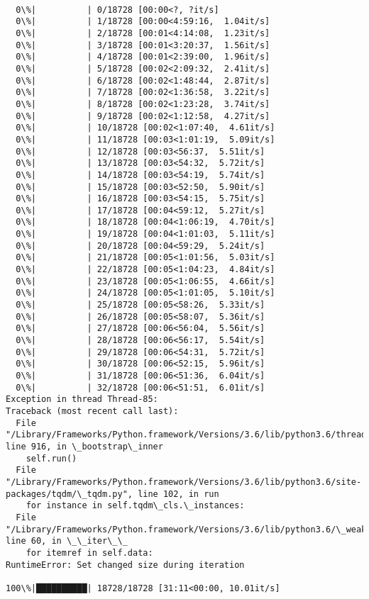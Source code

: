 \documentclass[11pt]{article}
\begin{document}
    \begin{Verbatim}[commandchars=\\\{\}]

  0\%|          | 0/18728 [00:00<?, ?it/s]
  0\%|          | 1/18728 [00:00<4:59:16,  1.04it/s]
  0\%|          | 2/18728 [00:01<4:14:08,  1.23it/s]
  0\%|          | 3/18728 [00:01<3:20:37,  1.56it/s]
  0\%|          | 4/18728 [00:01<2:39:00,  1.96it/s]
  0\%|          | 5/18728 [00:02<2:09:32,  2.41it/s]
  0\%|          | 6/18728 [00:02<1:48:44,  2.87it/s]
  0\%|          | 7/18728 [00:02<1:36:58,  3.22it/s]
  0\%|          | 8/18728 [00:02<1:23:28,  3.74it/s]
  0\%|          | 9/18728 [00:02<1:12:58,  4.27it/s]
  0\%|          | 10/18728 [00:02<1:07:40,  4.61it/s]
  0\%|          | 11/18728 [00:03<1:01:19,  5.09it/s]
  0\%|          | 12/18728 [00:03<56:37,  5.51it/s]  
  0\%|          | 13/18728 [00:03<54:32,  5.72it/s]
  0\%|          | 14/18728 [00:03<54:19,  5.74it/s]
  0\%|          | 15/18728 [00:03<52:50,  5.90it/s]
  0\%|          | 16/18728 [00:03<54:15,  5.75it/s]
  0\%|          | 17/18728 [00:04<59:12,  5.27it/s]
  0\%|          | 18/18728 [00:04<1:06:19,  4.70it/s]
  0\%|          | 19/18728 [00:04<1:01:03,  5.11it/s]
  0\%|          | 20/18728 [00:04<59:29,  5.24it/s]  
  0\%|          | 21/18728 [00:05<1:01:56,  5.03it/s]
  0\%|          | 22/18728 [00:05<1:04:23,  4.84it/s]
  0\%|          | 23/18728 [00:05<1:06:55,  4.66it/s]
  0\%|          | 24/18728 [00:05<1:01:05,  5.10it/s]
  0\%|          | 25/18728 [00:05<58:26,  5.33it/s]  
  0\%|          | 26/18728 [00:05<58:07,  5.36it/s]
  0\%|          | 27/18728 [00:06<56:04,  5.56it/s]
  0\%|          | 28/18728 [00:06<56:17,  5.54it/s]
  0\%|          | 29/18728 [00:06<54:31,  5.72it/s]
  0\%|          | 30/18728 [00:06<52:15,  5.96it/s]
  0\%|          | 31/18728 [00:06<51:36,  6.04it/s]
  0\%|          | 32/18728 [00:06<51:51,  6.01it/s]
Exception in thread Thread-85:
Traceback (most recent call last):
  File "/Library/Frameworks/Python.framework/Versions/3.6/lib/python3.6/threading.py", line 916, in \_bootstrap\_inner
    self.run()
  File "/Library/Frameworks/Python.framework/Versions/3.6/lib/python3.6/site-packages/tqdm/\_tqdm.py", line 102, in run
    for instance in self.tqdm\_cls.\_instances:
  File "/Library/Frameworks/Python.framework/Versions/3.6/lib/python3.6/\_weakrefset.py", line 60, in \_\_iter\_\_
    for itemref in self.data:
RuntimeError: Set changed size during iteration

100\%|██████████| 18728/18728 [31:11<00:00, 10.01it/s]

    \end{Verbatim}
\end{document}
